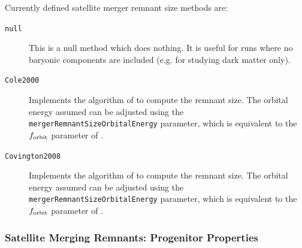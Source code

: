 Currently defined satellite merger remnant size methods are:
\begin{description}
 \item [{\tt null}] This is a null method which does nothing. It is useful for runs where no baryonic components are included (e.g. for studying dark matter only).
 \item [{\tt Cole2000}] Implements the algorithm of \cite{cole_hierarchical_2000} to compute the remnant size. The orbital energy assumed can be adjusted using the {\tt mergerRemnantSizeOrbitalEnergy} parameter, which is equivalent to the $f_{\rm orbit}$ parameter of \cite{cole_hierarchical_2000}.
 \item [{\tt Covington2008}] Implements the algorithm of \cite{covington_predicting_2008} to compute the remnant size. The orbital energy assumed can be adjusted using the {\tt mergerRemnantSizeOrbitalEnergy} parameter, which is equivalent to the $f_{\rm orbit}$ parameter of \cite{cole_hierarchical_2000}.
\end{description}

\subsubsection{Satellite Merging Remnants: Progenitor Properties}

